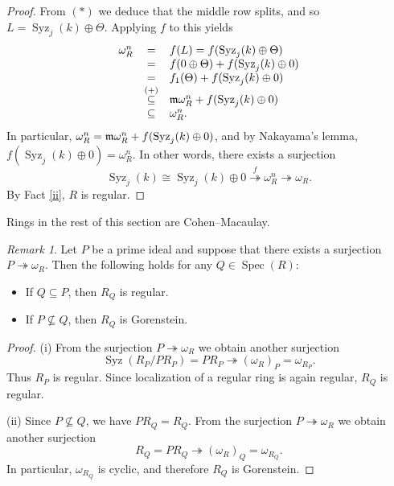 \documentclass[10. pt,a4paper]{amsart}
\theoremstyle{definition}
\theoremstyle{remark}
\newtheorem{remark}[theorem]{Remark}\newtheorem{fact}[theorem]{Fact}
\newcommand{\Spec}{\operatorname{Spec}}
\newcommand{\fm}{\frak{m}}
\begin{document}
\begin{proof}
	From $(\ast)$ we deduce that the middle row splits, and so $L = \operatorname{Syz}_j(k) \oplus \Theta$. Applying $f$ to this yields
	\[
	\begin{array}{rcl}
	\omega_R^n &=& f(L) = f(\operatorname{Syz}_j(k) \oplus \Theta) \\
	&=& f(0 \oplus \Theta) + f(\operatorname{Syz}_j(k) \oplus 0) \\
	&=& f_1(\Theta) + f(\operatorname{Syz}_j(k) \oplus 0) \\
	&\stackrel{(+)}{\subseteq}& \fm \omega_R^n + f(\operatorname{Syz}_j(k) \oplus 0) \\
	&\subseteq& \omega_R^n.
	\end{array}
	\]
	In particular, $\omega_R^n = \fm \omega_R^n + f(\operatorname{Syz}_j(k) \oplus 0)$, and by Nakayama's lemma, $f(\operatorname{Syz}_j(k) \oplus 0) = \omega_R^n$. In other words, there exists a surjection
	\[
	\operatorname{Syz}_j(k) \cong \operatorname{Syz}_j(k) \oplus 0 \stackrel{f}{\twoheadrightarrow} \omega_R^n \twoheadrightarrow \omega_R.
	\]
	By Fact \ref{ii}, $R$ is regular.
\end{proof}

Rings in the rest of this section are Cohen--Macaulay.

\begin{remark}\label{104}
	Let $P$ be a prime ideal and suppose that there exists a surjection $P \twoheadrightarrow \omega_R$. Then the following holds for any $Q \in \Spec(R)$:
	\begin{itemize}
		\item[(i)] If $Q \subseteq P$, then $R_Q$ is regular.
		\item[(ii)] If $P \nsubseteq Q$, then $R_Q$ is Gorenstein.
	\end{itemize}
\end{remark}

\begin{proof}
	(i) From the surjection $P \twoheadrightarrow \omega_R$ we obtain another surjection
	\[
	\operatorname{Syz}(R_P / P R_P) = P R_P \twoheadrightarrow (\omega_R)_P = \omega_{R_P}.
	\]
	Thus $R_P$ is regular. Since localization of a regular ring is again regular, $R_Q$ is regular.
	
	(ii) Since $P \nsubseteq Q$, we have $P R_Q = R_Q$. From the surjection $P \twoheadrightarrow \omega_R$ we obtain another surjection
	\[
	R_Q = P R_Q \twoheadrightarrow (\omega_R)_Q = \omega_{R_Q}.
	\]
	In particular, $\omega_{R_Q}$ is cyclic, and therefore $R_Q$ is Gorenstein.
\end{proof}
\end{document}
